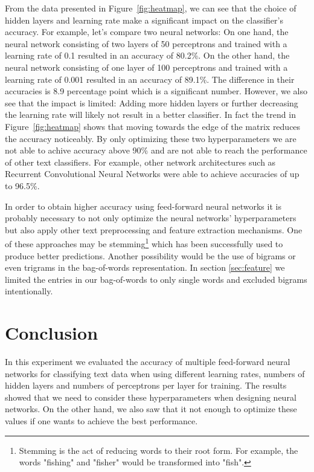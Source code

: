 \documentclass[sigconf]{acmart}
\begin{document}
From the data presented in Figure~\ref{fig:heatmap}, we can see that the choice of hidden layers and learning rate make a significant impact on the classifier's accuracy. For example, let's compare two neural networks: On one hand, the neural network consisting of two layers of 50 perceptrons and trained with a learning rate of 0.1 resulted in an accuracy of 80.2\%. On the other hand, the neural network consisting of one layer of 100 perceptrons and trained with a learning rate of 0.001 resulted in an accuracy of 89.1\%. The difference in their accuracies is 8.9 percentage point which is a significant number.
However, we also see that the impact is limited: Adding more hidden layers or further decreasing the learning rate will likely not result in a better classifier. In fact the trend in Figure~\ref{fig:heatmap} shows that moving towards the edge of the matrix reduces the accuracy noticeably. By only optimizing these two hyperparameters we are not able to achive accuracy above 90\% and are not able to reach the performance of other text classifiers. For example, other network architectures such as Recurrent Convolutional Neural Networks were able to achieve accuracies of up to 96.5\%\cite{rcnn}.

In order to obtain higher accuracy using feed-forward neural networks it is probably necessary to not only optimize the neural networks' hyperparameters but also apply other text preprocessing and feature extraction mechanisms. One of these approaches may be stemming\footnote{Stemming is the act of reducing words to their root form. For example, the words "fishing" and "fisher" would be transformed into "fish".} which has been successfully used to produce better predictions\cite{stemming}. Another possibility would be the use of bigrams or even trigrams in the bag-of-words representation. In section \ref{sec:feature} we limited the entries in our bag-of-words to only single words and excluded bigrams intentionally.

\section{Conclusion}

In this experiment we evaluated the accuracy of multiple feed-forward neural networks for classifying text data when using different learning rates, numbers of hidden layers and numbers of perceptrons per layer for training. The results showed that we need to consider these hyperparameters when designing neural networks. On the other hand, we also saw that it not enough to optimize these values if one wants to achieve the best performance.
\end{document}
